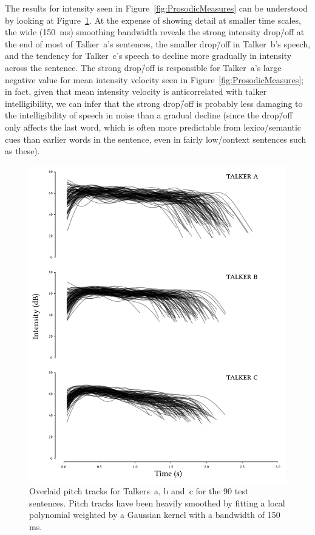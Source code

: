 The results for intensity seen in Figure~\ref{fig:ProsodicMeasures} can be understood by looking at Figure~\ref{fig:IntensityTracks}.  At the expense of showing detail at smaller time scales, the wide (150~ms) smoothing bandwidth reveals the strong intensity drop\=/off at the end of most of Talker~\ac{a}’s sentences, the smaller drop\=/off in Talker~\ac{b}’s speech, and the tendency for Talker~\ac{c}’s speech to decline more gradually in intensity across the sentence.  The strong drop\=/off is responsible for Talker~\ac{a}’s large negative value for mean intensity velocity seen in Figure~\ref{fig:ProsodicMeasures}; in fact, given that mean intensity velocity is anticorrelated with talker intelligibility, we can infer that the strong drop\=/off is probably less damaging to the intelligibility of speech in noise than a gradual decline (since the drop\=/off only affects the last word, which is often more predictable from lexico\-/semantic cues than earlier words in the sentence, even in fairly low\-/context sentences such as these).

\begin{figure}[ptb]
	\begin{centering}
	\includegraphics{figures/posthocs/IntensityTracks.pdf}
	\caption[Intensity track overlays of the test sentences]{Overlaid pitch tracks for Talkers~\ac{a}, \ac{b} and~\ac{c} for the 90 test sentences.  Pitch tracks have been heavily smoothed by fitting a local polynomial weighted by a Gaussian kernel with a bandwidth of 150 ms.\label{fig:IntensityTracks}}
	\end{centering}
\end{figure}



